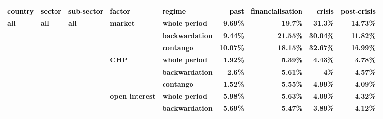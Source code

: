 \documentclass[
  authoryear,
  preprint,
  3p]{elsarticle}
\begin{document}
\begin{longtable}[t]{>{}l>{}l>{}l>{}l>{}l>{}r>{}r>{}r>{}r}
\toprule
\textcolor{black}{\textbf{country}} & \textcolor{black}{\textbf{sector}} & \textcolor{black}{\textbf{sub-sector}} & \textcolor{black}{\textbf{factor}} & \textcolor{black}{\textbf{regime}} & \textcolor{black}{\textbf{past}} & \textcolor{black}{\textbf{financialisation}} & \textcolor{black}{\textbf{crisis}} & \textcolor{black}{\textbf{post-crisis}}\\
\midrule
\textbf{all} & \textbf{all} & \textbf{all} & \textbf{market} & \textbf{whole period} & \textcolor[HTML]{4285f4}{\textbf{9.69\%}} & \textcolor[HTML]{4285f4}{\textbf{19.7\%}} & \textcolor[HTML]{4285f4}{\textbf{31.3\%}} & \textcolor[HTML]{4285f4}{\textbf{14.73\%}}\\
\textbf{} & \textbf{} & \textbf{} & \textbf{} & \textbf{backwardation} & \textcolor[HTML]{4285f4}{\textbf{9.44\%}} & \textcolor[HTML]{4285f4}{\textbf{21.55\%}} & \textcolor[HTML]{4285f4}{\textbf{30.04\%}} & \textcolor[HTML]{4285f4}{\textbf{11.82\%}}\\
\textbf{} & \textbf{} & \textbf{} & \textbf{} & \textbf{contango} & \textcolor[HTML]{4285f4}{\textbf{10.07\%}} & \textcolor[HTML]{4285f4}{\textbf{18.15\%}} & \textcolor[HTML]{4285f4}{\textbf{32.67\%}} & \textcolor[HTML]{4285f4}{\textbf{16.99\%}}\\
\textbf{} & \textbf{} & \textbf{} & \textbf{CHP} & \textbf{whole period} & \textcolor[HTML]{4285f4}{\textbf{1.92\%}} & \textcolor[HTML]{4285f4}{\textbf{5.39\%}} & \textcolor[HTML]{4285f4}{\textbf{4.43\%}} & \textcolor[HTML]{4285f4}{\textbf{3.78\%}}\\
\textbf{} & \textbf{} & \textbf{} & \textbf{} & \textbf{backwardation} & \textcolor[HTML]{4285f4}{\textbf{2.6\%}} & \textcolor[HTML]{4285f4}{\textbf{5.61\%}} & \textcolor[HTML]{4285f4}{\textbf{4\%}} & \textcolor[HTML]{4285f4}{\textbf{4.57\%}}\\
\addlinespace
\textbf{} & \textbf{} & \textbf{} & \textbf{} & \textbf{contango} & \textcolor[HTML]{4285f4}{\textbf{1.52\%}} & \textcolor[HTML]{4285f4}{\textbf{5.55\%}} & \textcolor[HTML]{4285f4}{\textbf{4.99\%}} & \textcolor[HTML]{4285f4}{\textbf{4.09\%}}\\
\textbf{} & \textbf{} & \textbf{} & \textbf{open interest} & \textbf{whole period} & \textcolor[HTML]{4285f4}{\textbf{5.98\%}} & \textcolor[HTML]{4285f4}{\textbf{5.63\%}} & \textcolor[HTML]{4285f4}{\textbf{4.09\%}} & \textcolor[HTML]{4285f4}{\textbf{4.32\%}}\\
\textbf{} & \textbf{} & \textbf{} & \textbf{} & \textbf{backwardation} & \textcolor[HTML]{4285f4}{\textbf{5.69\%}} & \textcolor[HTML]{4285f4}{\textbf{5.47\%}} & \textcolor[HTML]{4285f4}{\textbf{3.89\%}} & \textcolor[HTML]{4285f4}{\textbf{4.12\%}}\\

\end{longtable}
\end{document}
